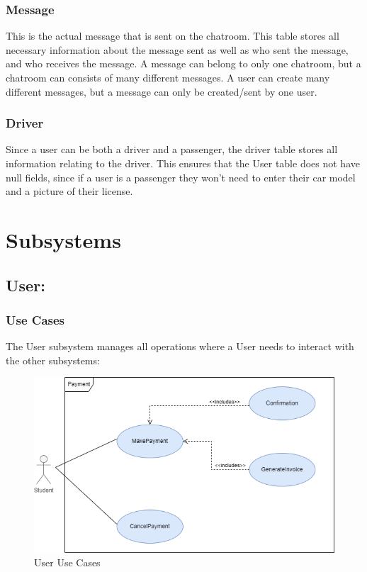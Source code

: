 \documentclass[hidelinks, 12pt, a4paper]{article}
\begin{document}
    
      \subsubsection{Message}
        This is the actual message that is sent on the chatroom. This table stores all necessary information about the message sent as well as who sent the message, and who receives the message. A message can belong to only one chatroom, but a chatroom can consists of many different messages. A user can create many different messages, but a message can only be created/sent by one user.

    \subsubsection{Driver}
    Since a user can be both a driver and a passenger, the driver table stores all information relating to the driver. This ensures that the User table does not have null fields, since if a user is a passenger they won’t need to enter their car model and a picture of their license.
         
\newpage
\section{Subsystems}

     \subsection{User:}
                \subsubsection{Use Cases}
                  The User subsystem manages all operations where a User needs to interact with the other subsystems:
                  
                    \begin{figure}[H]
                    
                        \centering
                        \includegraphics[width=15cm]{images/Payment UseCase.drawio.png}
                        \caption{User Use Cases}
                        \label{fig:User UseCases}
                        
                    \end{figure}
            
\end{document}
